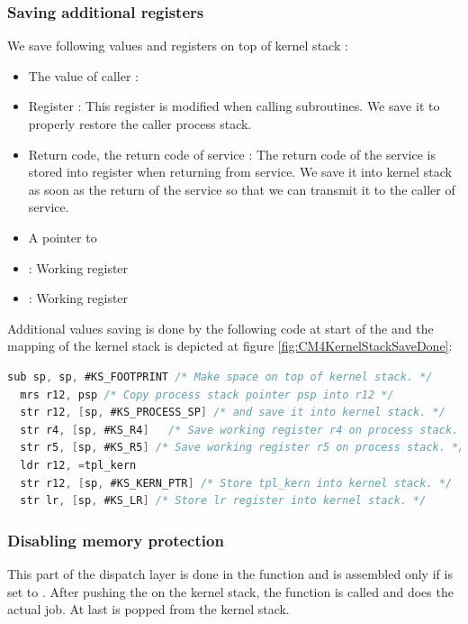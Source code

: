 \subsubsection{Saving additional registers}

We save following values and registers on top of kernel stack :
\begin{itemize}
\item The value of caller  : 
\item Register  : This register is modified when calling subroutines. We save it to properly restore the caller process stack.
\item Return code, the return code of service : The return code of the service is stored into  register when returning from service. We save it into kernel stack as soon as the return of the service so that we can transmit it to the caller of service.
\item A pointer to 
\item {} : Working register
\item {} : Working register
\end{itemize}


Additional values saving is done by the following code at start of the  and the mapping of the kernel stack is depicted at figure \ref{fig:CM4KernelStackSaveDone}:

\begin{lstlisting}[language=C]
  sub sp, sp, #KS_FOOTPRINT /* Make space on top of kernel stack. */
  mrs r12, psp /* Copy process stack pointer psp into r12 */
  str r12, [sp, #KS_PROCESS_SP] /* and save it into kernel stack. */
  str r4, [sp, #KS_R4]	 /* Save working register r4 on process stack. */
  str r5, [sp, #KS_R5] /* Save working register r5 on process stack. */
  ldr r12, =tpl_kern
  str r12, [sp, #KS_KERN_PTR] /* Store tpl_kern into kernel stack. */
  str lr, [sp, #KS_LR] /* Store lr register into kernel stack. */
\end{lstlisting}

\subsubsection{Disabling memory protection}

This part of the dispatch layer is done in the  function and is assembled only if  is set to \YES. After pushing the  on the kernel stack, the  function is called and does the actual job. At last  is popped from the kernel stack.

